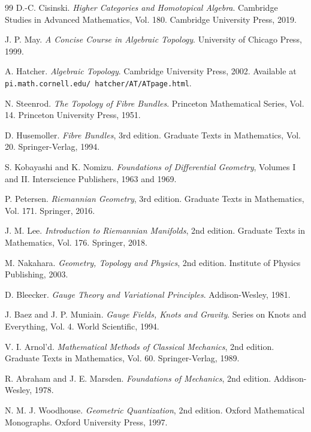 \documentclass[11pt]{article}
\theoremstyle{definition}
\begin{document}
\begin{thebibliography}{99}
D.-C. Cisinski.
\textit{Higher Categories and Homotopical Algebra}.
Cambridge Studies in Advanced Mathematics, Vol. 180. Cambridge University Press, 2019.

J. P. May.
\textit{A Concise Course in Algebraic Topology}.
University of Chicago Press, 1999.

A. Hatcher.
\textit{Algebraic Topology}.
Cambridge University Press, 2002.
Available at \texttt{pi.math.cornell.edu/~hatcher/AT/ATpage.html}.

N. Steenrod.
\textit{The Topology of Fibre Bundles}.
Princeton Mathematical Series, Vol. 14. Princeton University Press, 1951.

D. Husemoller.
\textit{Fibre Bundles}, 3rd edition.
Graduate Texts in Mathematics, Vol. 20. Springer-Verlag, 1994.

S. Kobayashi and K. Nomizu.
\textit{Foundations of Differential Geometry}, Volumes I and II.
Interscience Publishers, 1963 and 1969.

P. Petersen.
\textit{Riemannian Geometry}, 3rd edition.
Graduate Texts in Mathematics, Vol. 171. Springer, 2016.

J. M. Lee.
\textit{Introduction to Riemannian Manifolds}, 2nd edition.
Graduate Texts in Mathematics, Vol. 176. Springer, 2018.

M. Nakahara.
\textit{Geometry, Topology and Physics}, 2nd edition.
Institute of Physics Publishing, 2003.

D. Bleecker.
\textit{Gauge Theory and Variational Principles}.
Addison-Wesley, 1981.

J. Baez and J. P. Muniain.
\textit{Gauge Fields, Knots and Gravity}.
Series on Knots and Everything, Vol. 4. World Scientific, 1994.

V. I. Arnol'd.
\textit{Mathematical Methods of Classical Mechanics}, 2nd edition.
Graduate Texts in Mathematics, Vol. 60. Springer-Verlag, 1989.

R. Abraham and J. E. Marsden.
\textit{Foundations of Mechanics}, 2nd edition.
Addison-Wesley, 1978.

N. M. J. Woodhouse.
\textit{Geometric Quantization}, 2nd edition.
Oxford Mathematical Monographs. Oxford University Press, 1997.


\end{thebibliography}
\end{document}
